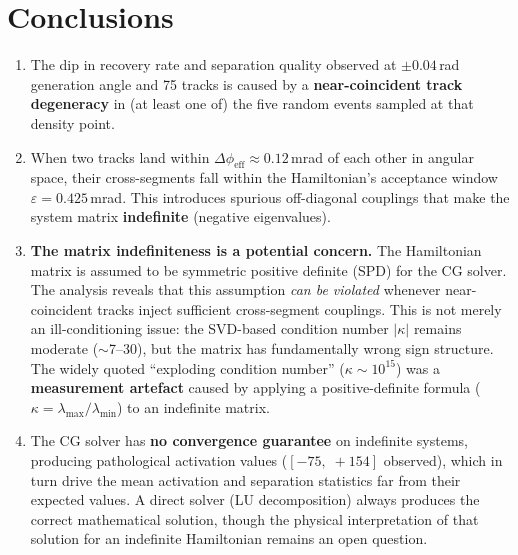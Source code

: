 \documentclass[12pt,a4paper]{article}
\newcommand{\eps}{\varepsilon}
\begin{document}
\section{Conclusions}
\label{sec:conclusions}

\begin{enumerate}
  \item The dip in recovery rate and separation quality observed at
        $\pm0.04$\,rad generation angle and 75 tracks is caused by a
        \textbf{near-coincident track degeneracy} in (at least one of) the
        five random events sampled at that density point.

  \item When two tracks land within $\Delta\phi_\text{eff} \approx 0.12$\,mrad
        of each other in angular space, their cross-segments fall within the
        Hamiltonian's acceptance window $\eps = 0.425$\,mrad.
        This introduces spurious off-diagonal couplings that make
        the system matrix \textbf{indefinite} (negative eigenvalues).

  \item \textbf{The matrix indefiniteness is a potential concern.}
        The Hamiltonian matrix is assumed to be symmetric positive definite (SPD)
        for the CG solver.
        The analysis reveals that this assumption \emph{can be violated}
        whenever near-coincident tracks inject sufficient cross-segment couplings.
        This is not merely an ill-conditioning issue:
        the SVD-based condition number $|\kappa|$ remains moderate ($\sim$7--30),
        but the matrix has fundamentally wrong sign structure.
        The widely quoted ``exploding condition number'' ($\kappa \sim 10^{15}$)
        was a \textbf{measurement artefact} caused by applying a positive-definite
        formula ($\kappa = \lambda_\text{max}/\lambda_\text{min}$) to an indefinite
        matrix.

  \item The CG solver has \textbf{no convergence guarantee} on indefinite
        systems, producing pathological activation values ($[-75,\;+154]$
        observed), which in turn drive the mean activation and separation
        statistics far from their expected values.
        A direct solver (LU decomposition) always produces the correct
        mathematical solution, though the physical interpretation of that
        solution for an indefinite Hamiltonian remains an open question.


\end{enumerate}
\end{document}
